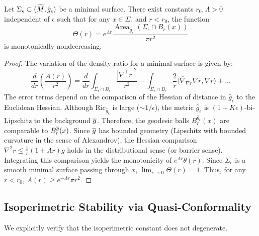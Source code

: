 \begin{proposition}
Let $\Sigma_\epsilon \subset (\widetilde{M}, \hat{g}_\epsilon)$ be a minimal surface. There exist constants $r_0, \Lambda > 0$ independent of $\epsilon$ such that for any $x \in \Sigma_\epsilon$ and $r < r_0$, the function
\[ \Theta(r) = e^{\Lambda r} \frac{\operatorname{Area}_{\hat{g}_\epsilon}(\Sigma_\epsilon \cap B_r(x))}{\pi r^2} \]
is monotonically nondecreasing.
\end{proposition}
\begin{proof}
The variation of the density ratio for a minimal surface is given by:
\[ \frac{d}{dr} \left( \frac{A(r)}{r^2} \right) = \frac{d}{dr} \int_{\Sigma_\epsilon \cap B_r} \frac{|\nabla^\perp r|^2}{r^2} - \int_{\Sigma_\epsilon \cap B_r} \frac{2}{r} \langle \bar{\nabla}_{\nabla r} \nabla r, \nabla r \rangle + \dots \]
The error terms depend on the comparison of the Hessian of distance in $\hat{g}_\epsilon$ to the Euclidean Hessian.
Although $\text{Ric}_{\hat{g}_\epsilon}$ is large ($\sim 1/\epsilon$), the metric $\hat{g}_\epsilon$ is $(1+K\epsilon)$-bi-Lipschitz to the background $\overline{g}$.
Therefore, the geodesic balls $B_r^{\hat{g}_\epsilon}(x)$ are comparable to $B_r^{\overline{g}}(x)$.
Since $\overline{g}$ has bounded geometry (Lipschitz with bounded curvature in the sense of Alexandrov), the Hessian comparison $\nabla^2 r \le \frac{1}{r}(1 + \Lambda r)g$ holds in the distributional sense (or barrier sense).
Integrating this comparison yields the monotonicity of $e^{\Lambda r} \theta(r)$.
Since $\Sigma_\epsilon$ is a smooth minimal surface passing through $x$, $\lim_{r \to 0} \Theta(r) = 1$.
Thus, for any $r < r_0$, $A(r) \ge e^{-\Lambda r} \pi r^2$.
\end{proof}

\subsection{Isoperimetric Stability via Quasi-Conformality}
We explicitly verify that the isoperimetric constant does not degenerate.

